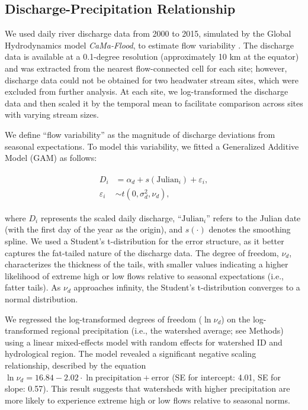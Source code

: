 \documentclass[11pt, class=article, crop=false]{standalone}
\theoremstyle{definition}
\begin{document}


\subsection{Discharge-Precipitation Relationship}
We used daily river discharge data from 2000 to 2015, simulated by the Global Hydrodynamics model \textit{CaMa-Flood}, to estimate flow variability  \citep{yamazaki_deriving_2009, kimura_methodology_2023, lin_global_2019}.
The discharge data is available at a 0.1-degree resolution (approximately 10 km at the equator) and was extracted from the nearest flow-connected cell for each site; however, discharge data could not be obtained for two headwater stream sites, which were excluded from further analysis.
At each site, we log-transformed the discharge data and then scaled it by the temporal mean to facilitate comparison across sites with varying stream sizes.

We define ``flow variability'' as the magnitude of discharge deviations from seasonal expectations.
To model this variability, we fitted a Generalized Additive Model (GAM) as follows:

\begin{align}
    \begin{split}
    D_i &= \alpha_d + s(\mbox{Julian}_i) + \varepsilon_i,\\
    \varepsilon_i &\sim t(0, \sigma_d^2, \nu_d),
    \end{split}
\end{align}

where $D_i$ represents the scaled daily discharge, ``$\mbox{Julian}_i$'' refers to the Julian date (with the first day of the year as the origin), and $s(\cdot)$ denotes the smoothing spline.
We used a Student's t-distribution for the error structure, as it better captures the fat-tailed nature of the discharge data.
The degree of freedom, $\nu_d$, characterizes the thickness of the tails, with smaller values indicating a higher likelihood of extreme high or low flows relative to seasonal expectations (i.e., fatter tails).
As $\nu_d$ approaches infinity, the Student's t-distribution converges to a normal distribution.

We regressed the log-transformed degrees of freedom ($\ln \nu_d$) on the log-transformed regional precipitation (i.e., the watershed average; see Methods) using a linear mixed-effects model with random effects for watershed ID and hydrological region.
The model revealed a significant negative scaling relationship, described by the equation $\ln \nu_d = 16.84 - 2.02 \cdot \ln \text{precipitation} + \text{error}$ (SE for intercept: 4.01, SE for slope: 0.57).
This result suggests that watersheds with higher precipitation are more likely to experience extreme high or low flows relative to seasonal norms.
\end{document}
